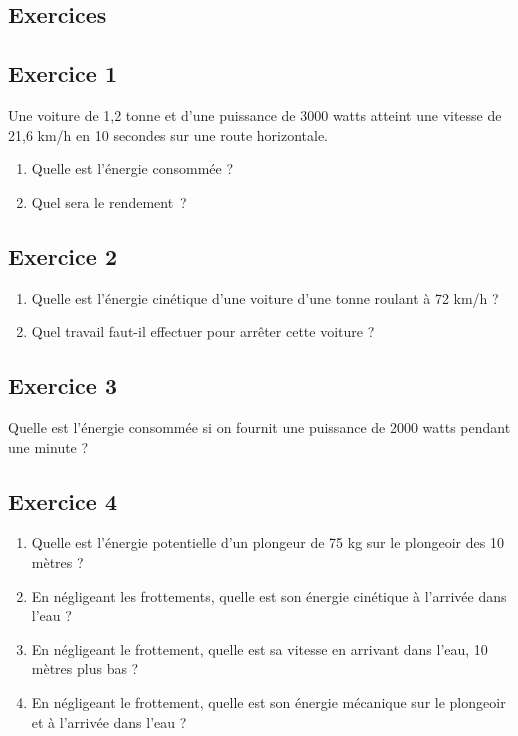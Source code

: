 \begin{multicols}{2}
\section{Exercices}

\subsection*{Exercice 1}

Une voiture de 1,2 tonne et d'une puissance de 3000 watts atteint une
vitesse de 21,6 km/h en 10 secondes sur une route horizontale.

\begin{enumerate}
  \item   Quelle est l'énergie consommée ?
  \item   Quel sera le rendement~?
\end{enumerate}

\subsection*{Exercice 2}

\begin{enumerate}
  \item Quelle est l'énergie cinétique d'une voiture d'une tonne roulant à 72
km/h ?
   \item Quel travail faut-il effectuer pour arrêter cette voiture ?
\end{enumerate}

\subsection*{Exercice 3 }

Quelle est l'énergie consommée si on fournit une puissance de 2000 watts
pendant une minute ?

\subsection*{Exercice 4}

\begin{enumerate}
\item   Quelle est l'énergie potentielle d'un plongeur de 75 kg sur le
  plongeoir des 10 mètres ?
\item   En négligeant les frottements, quelle est son énergie cinétique à
  l'arrivée dans l'eau ?
\item   En négligeant le frottement, quelle est sa vitesse en arrivant dans
  l'eau, 10 mètres plus bas ?
\item   En négligeant le frottement, quelle est son énergie mécanique sur le
  plongeoir et à l'arrivée dans l'eau ?
\end{enumerate}


\end{multicols}
